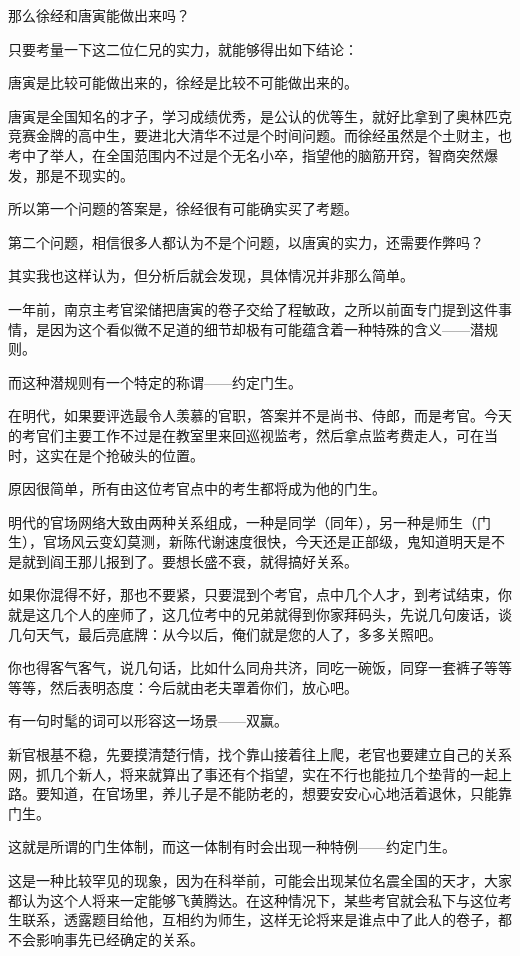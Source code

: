 \begin{multicols}{\theparacolNo}
		那么徐经和唐寅能做出来吗？

		只要考量一下这二位仁兄的实力，就能够得出如下结论：

		唐寅是比较可能做出来的，徐经是比较不可能做出来的。

		唐寅是全国知名的才子，学习成绩优秀，是公认的优等生，就好比拿到了奥林匹克竞赛金牌的高中生，要进北大清华不过是个时间问题。而徐经虽然是个土财主，也考中了举人，在全国范围内不过是个无名小卒，指望他的脑筋开窍，智商突然爆发，那是不现实的。

		所以第一个问题的答案是，徐经很有可能确实买了考题。

		第二个问题，相信很多人都认为不是个问题，以唐寅的实力，还需要作弊吗？

		其实我也这样认为，但分析后就会发现，具体情况并非那么简单。

		一年前，南京主考官梁储把唐寅的卷子交给了程敏政，之所以前面专门提到这件事情，是因为这个看似微不足道的细节却极有可能蕴含着一种特殊的含义——潜规则。

		而这种潜规则有一个特定的称谓——约定门生。

		在明代，如果要评选最令人羡慕的官职，答案并不是尚书、侍郎，而是考官。今天的考官们主要工作不过是在教室里来回巡视监考，然后拿点监考费走人，可在当时，这实在是个抢破头的位置。

		原因很简单，所有由这位考官点中的考生都将成为他的门生。

		明代的官场网络大致由两种关系组成，一种是同学（同年），另一种是师生（门生），官场风云变幻莫测，新陈代谢速度很快，今天还是正部级，鬼知道明天是不是就到阎王那儿报到了。要想长盛不衰，就得搞好关系。

		如果你混得不好，那也不要紧，只要混到个考官，点中几个人才，到考试结束，你就是这几个人的座师了，这几位考中的兄弟就得到你家拜码头，先说几句废话，谈几句天气，最后亮底牌：从今以后，俺们就是您的人了，多多关照吧。

		你也得客气客气，说几句话，比如什么同舟共济，同吃一碗饭，同穿一套裤子等等等等，然后表明态度：今后就由老夫罩着你们，放心吧。

		有一句时髦的词可以形容这一场景——双赢。

		新官根基不稳，先要摸清楚行情，找个靠山接着往上爬，老官也要建立自己的关系网，抓几个新人，将来就算出了事还有个指望，实在不行也能拉几个垫背的一起上路。要知道，在官场里，养儿子是不能防老的，想要安安心心地活着退休，只能靠门生。

		这就是所谓的门生体制，而这一体制有时会出现一种特例——约定门生。

		这是一种比较罕见的现象，因为在科举前，可能会出现某位名震全国的天才，大家都认为这个人将来一定能够飞黄腾达。在这种情况下，某些考官就会私下与这位考生联系，透露题目给他，互相约为师生，这样无论将来是谁点中了此人的卷子，都不会影响事先已经确定的关系。


\end{multicols}
